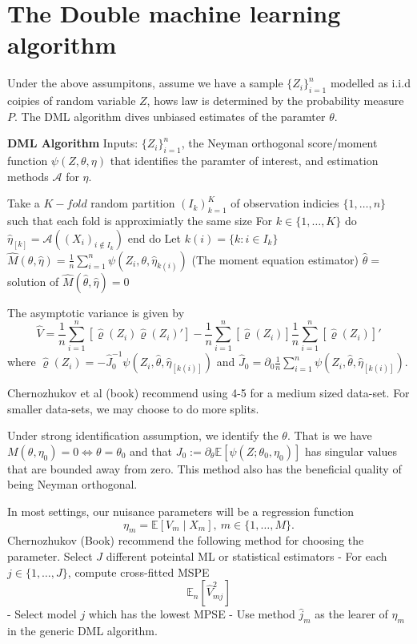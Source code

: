 \documentclass[
]{article}
\begin{document}
\section{The Double machine learning
algorithm}\label{the-double-machine-learning-algorithm}

Under the above assumpitons, assume we have a sample
\(\{ Z_{i} \}_{i=1}^n\) modelled as i.i.d coipies of random variable
\(Z\), hows law is determined by the probability measure \(P\). The DML
algorithm dives unbiased estimates of the paramter \(\theta\).

\textbf{DML Algorithm} Inputs: \(\{ Z_{i} \}_{i=1}^n\), the Neyman
orthogonal score/moment function \(\psi (Z, \theta, \eta)\) that
identifies the paramter of interest, and estimation methods
\(\mathcal{A}\) for \(\eta\).

Take a \(K-fold\) random partition \((I_{k})_{k=1}^K\) of observation
indicies \(\{ 1, \dots, n \}\) such that each fold is approximiatly the
same size For \(k \in \{  1, \dots, K \}\) do
\(\hat{\eta}_{[k]} = \mathcal{A}((X_{i})_{i \not\in I_{k}})\) end do Let
\(k(i) = \{ k: i \in I_{k} \}\)
\(\hat{M}(\theta, \hat{\eta}) = \frac{1}{n}\sum_{i=1}^n \psi(Z_{i}, \theta, \hat{\eta}_{{k(i)}})\)
(The moment equation estimator) \(\hat{\theta} =\) solution of
\(\hat{M}(\hat{\theta}, \hat{\eta}) = 0\)

The asymptotic variance is given by
\[\hat{V} = \frac{1}{n} \sum_{{i=1}}^n [\hat{\varrho}(Z_{i})\hat{\varrho}(Z_{i})'] - \frac{1}{n} \sum_{i=1}^n[\hat{\varrho}(Z_{i})] \frac{1}{n} \sum_{i=1}^n[\hat{\varrho}(Z_{i})]'\]
where
\(\hat{\varrho}(Z_{i}) = - \hat{J}_{0}^{-1} \psi (Z_{i}, \hat{\theta}, \hat{\eta}_{[k(i)]})\)
and
\(\hat{J}_{0} = \partial_{0} \frac{1}{n} \sum_{i=1}^n \psi(Z_{i}, \hat{\theta}, \hat{\eta}_{[k(i)]})\).

Chernozhukov et al (book) recommend using 4-5 for a medium sized
data-set. For smaller data-sets, we may choose to do more splits.

Under strong identification assumption, we identify the \(\theta\). That
is we have \(M(\theta, \eta_{0}) = 0 \iff \theta=\theta_{0}\) and that
\(J_{0}:= \partial _\theta \mathbb{E}[\psi(Z; \theta_{0}, \eta_{0})]\)
has singular values that are bounded away from zero. This method also
has the beneficial quality of being Neyman orthogonal.

In most settings, our nuisance parameters will be a regression function
\[
\eta_{m} = \mathbb{E}[V_{m} \mid X_{m}], ~m \in \{ 1, \dots, M \}.
\] Chernozhukov (Book) recommend the following method for choosing the
parameter. Select \(J\) different poteintal ML or statistical estimators
- For each \(j \in \{ 1, \dots, J \}\), compute cross-fitted MSPE \[
\mathbb{E}_{n} [\hat{V}_{mj}^2]
\] - Select model \(j\) which has the lowest MPSE - Use method
\(\hat{j}_{m}\) as the learer of \(\eta_{m}\) in the generic DML
algorithm.
\end{document}
